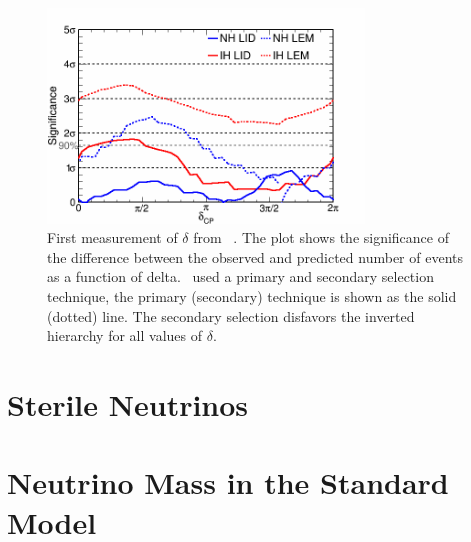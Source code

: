 \begin{figure}[h]
  \centering
  \includegraphics[width=0.75\textwidth]{figures/NOvAFADelta.png}
  \caption[First Measurement of $\delta$ by \nova]{First measurement of $\delta$ from \nova~\cite{ref:NOvAFANuE}. The plot shows the significance of the difference between the observed and predicted number of events as a function of delta. \nova~used a primary and secondary selection technique, the primary (secondary) technique is shown as the solid (dotted) line. The secondary selection disfavors the inverted hierarchy for all values of $\delta$.}
  \label{fig:NOvAFADelta}
\end{figure}

\section{Sterile Neutrinos}
\label{sec:Theory3+1}

\section{Neutrino Mass in the Standard Model}
